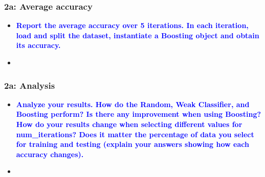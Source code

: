 \documentclass[../report.tex]{subfiles}
\begin{document}
    
    \begin{frame}[t]
        \frametitle{2a: Average accuracy}
        \begin{normalsize}
            \begin{itemize}
                \setlength\itemsep{1em}\fontsize{6pt}{6pt}

                \item[]{\textbf{\selectfont\textcolor{blue}{ Report the average accuracy over 5 iterations. In each iteration, load and split the dataset, instantiate a Boosting object and obtain its accuracy. }}}
                
                \item[]\textbf{}
            \end{itemize}
        \end{normalsize}
    \end{frame}

    \begin{frame}[t]
        \frametitle{2a: Analysis}
        \begin{normalsize}
            \begin{itemize}
                \setlength\itemsep{1em}\fontsize{6pt}{6pt}

                \item[]{\textbf{\selectfont\textcolor{blue}{ Analyze your results. How do the Random, Weak Classifier, and Boosting perform? Is there any improvement when using Boosting? How do your results change when selecting different values for num\_iterations? Does it matter the percentage of data you select for training and testing (explain your answers showing how each accuracy changes). }}}
                
                \item[]\textbf{}
            \end{itemize}
        \end{normalsize}
    \end{frame}
    
\end{document}
